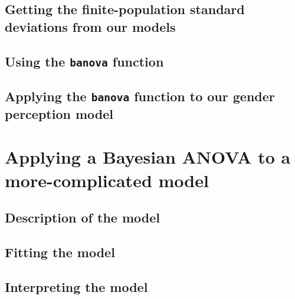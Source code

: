 \documentclass[
]{book}
\begin{document}
\hypertarget{getting-the-finite-population-standard-deviations-from-our-models}{%
\subsection{Getting the finite-population standard deviations from our models}\label{getting-the-finite-population-standard-deviations-from-our-models}}

\hypertarget{using-the-banova-function}{%
\subsection{\texorpdfstring{Using the \texttt{banova} function}{Using the banova function}}\label{using-the-banova-function}}

\hypertarget{applying-the-banova-function-to-our-gender-perception-model}{%
\subsection{\texorpdfstring{Applying the \texttt{banova} function to our gender perception model}{Applying the banova function to our gender perception model}}\label{applying-the-banova-function-to-our-gender-perception-model}}

\hypertarget{applying-a-bayesian-anova-to-a-more-complicated-model}{%
\section{Applying a Bayesian ANOVA to a more-complicated model}\label{applying-a-bayesian-anova-to-a-more-complicated-model}}

\hypertarget{description-of-the-model-10}{%
\subsection{Description of the model}\label{description-of-the-model-10}}

\hypertarget{fitting-the-model-9}{%
\subsection{Fitting the model}\label{fitting-the-model-9}}

\hypertarget{interpreting-the-model-7}{%
\subsection{Interpreting the model}\label{interpreting-the-model-7}}
\end{document}
